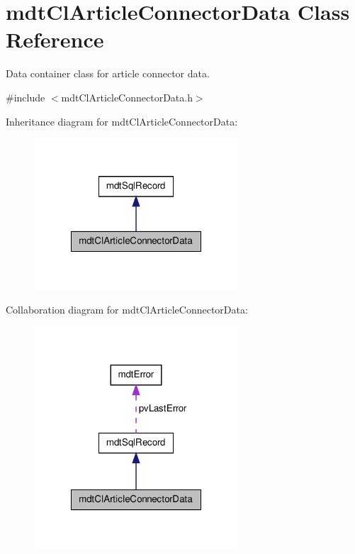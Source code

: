 \hypertarget{classmdt_cl_article_connector_data}{\section{mdt\-Cl\-Article\-Connector\-Data Class Reference}
\label{classmdt_cl_article_connector_data}
}


Data container class for article connector data.  




{\ttfamily \#include $<$mdt\-Cl\-Article\-Connector\-Data.\-h$>$}



Inheritance diagram for mdt\-Cl\-Article\-Connector\-Data\-:
\nopagebreak
\begin{figure}[H]
\begin{center}
\leavevmode
\includegraphics[width=216pt]{classmdt_cl_article_connector_data__inherit__graph}
\end{center}
\end{figure}


Collaboration diagram for mdt\-Cl\-Article\-Connector\-Data\-:
\nopagebreak
\begin{figure}[H]
\begin{center}
\leavevmode
\includegraphics[width=216pt]{classmdt_cl_article_connector_data__coll__graph}
\end{center}
\end{figure}
